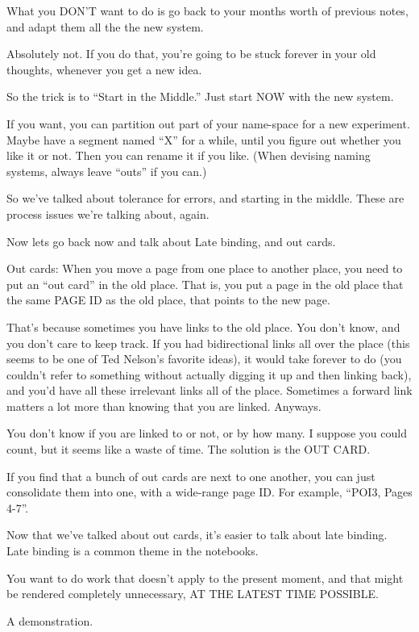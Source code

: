 \documentclass[oneside]{book}
\begin{document}
What you DON'T want to do is go back to your months worth of previous
notes, and adapt them all the the new system.

Absolutely not. If you do that, you're going to be stuck forever in
your old thoughts, whenever you get a new idea.

So the trick is to ``Start in the Middle.'' Just start NOW with the new
system.

If you want, you can partition out part of your name-space for a new
experiment. Maybe have a segment named ``X'' for a while, until you
figure out whether you like it or not. Then you can rename it if you
like. (When devising naming systems, always leave ``outs'' if you can.)

So we've talked about tolerance for errors, and starting in the
middle. These are process issues we're talking about, again.

Now lets go back now and talk about Late binding, and out cards.

Out cards: When you move a page from one place to another place, you
need to put an ``out card'' in the old place. That is, you put a page in
the old place that the same PAGE ID as the old place, that points to
the new page.

That's because sometimes you have links to the old place. You don't
know, and you don't care to keep track. If you had bidirectional links
all over the place (this seems to be one of Ted Nelson's favorite
ideas), it would take forever to do (you couldn't refer to something
without actually digging it up and then linking back), and you'd have
all these irrelevant links all of the place. Sometimes a forward link
matters a lot more than knowing that you are linked. Anyways.

You don't know if you are linked to or not, or by how many. I suppose
you could count, but it seems like a waste of time. The solution is
the OUT CARD.

If you find that a bunch of out cards are next to one another, you can
just consolidate them into one, with a wide-range page ID. For
example, ``POI3, Pages 4-7''.

Now that we've talked about out cards, it's easier to talk about late
binding. Late binding is a common theme in the notebooks.

You want to do work that doesn't apply to the present moment, and
that might be rendered completely unnecessary, AT THE LATEST TIME
POSSIBLE.

A demonstration.
\end{document}
